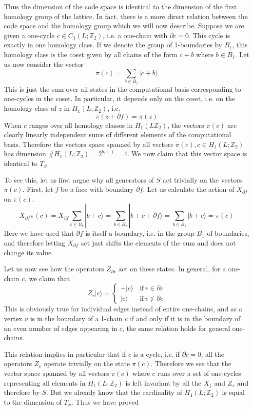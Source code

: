 \documentclass[a4paper, draft]{article}
\theoremstyle{own}
\theoremstyle{remark}
\newcommand{\Z}{\mathbb{Z}}
\begin{document}
Thus the dimension of the code space is identical to the dimension of the first homology group of the lattice. In fact, there is a more direct relation between the code space and the homology group which we will now describe. Suppose we are given a one-cycle $c \in C_1(L;\Z_2)$, i.e. a one-chain with $\partial c = 0$. This cycle is exactly in one homology class. If we denote the group of 1-boundaries by $B_1$, this homology class is the coset given by all chains of the form $c + b$ where $b \in B_1$. Let us now consider the vector
$$
\pi(c) = \sum_{b \in B_1} | c + b \rangle 
$$
This is just the sum over all states in the computational basis corresponding to one-cycles in the coset. In particular, it depends only on the coset, i.e. on the homology class of $z$ in $H_1(L;\Z_2)$, i.e.
$$
\pi(z + \partial f) = \pi(z)
$$
When $c$ ranges over all homology classes in $H_1(L\Z_2)$, the vectors $\pi(c)$ are clearly linearly independent sums of different elements of the computational basis. Therefore the vectors space spanned by all vectors $\pi(c), c \in H_1(L;\Z_2)$ has dimension $\# H_1(L;\Z_2) = 2^{b_1()} = 4$. We now claim that this vector space is identical to $T_S$. 

To see this, let us first argue why all generators of $S$ act trivially on the vectors $\pi(c)$. First, let $f$ be a face with boundary $\partial f$. Let us calculate the action of $X_{\partial f}$ on $\pi(c)$. 
$$
X_{\partial f} \pi(c) = X_{\partial f} \sum_{b \in B_1} |b + c \rangle 
= \sum_{b \in B_1} | b + c + \partial f \rangle = \sum_{b \in B_1} | b + c \rangle = \pi(c)
$$
Here we have used that $\partial f$ is itself a boundary, i.e. in the group $B_1$ of boundaries, and therefore letting $X_{\partial f}$ act just shifts the elements of the sum and does not change its value.


Let us now see how the operators $Z_{\partial v}$ act on these states. In general, for a one-chain $c$, we claim that 
$$
Z_v |c \rangle = \begin{cases} - |c \rangle & \, \text{if} \, v \in \partial c \\
|c \rangle & \, \text{if} \, v \notin \partial c 
\end{cases}
$$
This is obviously true for individual edges instead of entire one-chains, and as a vertex $v$ is in the boundary of a 1-chain $c$ if and only if it is in the boundary of an even number of edges appearing in $c$, the same relation holds for general one-chains. 

This relation implies in particular that if $c$ is a cycle, i.e. if $\partial c = 0$, all the operators $Z_v$ operate trivially on the state $\pi(c)$. Therefore we see that the vector space spanned by all vectors $\pi(c)$ where $c$ runs over a set of one-cycles representing all elements in $H_1(L;\Z_2)$ is left invariant by all the $X_f$ and $Z_v$ and therefore by $S$. But we already know that the cardinality of $H_1(L;\Z_2)$ is equal to the dimension of $T_S$. Thus we have proved 
\end{document}
